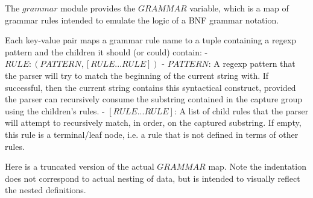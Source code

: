 The $grammar$ module provides the $GRAMMAR$ variable, which is a map of grammar rules intended to emulate the logic of a BNF grammar notation.

Each key-value pair maps a grammar rule name to a tuple containing a regexp pattern and the children it should (or could) contain:
- $RULE: (PATTERN, [RULE...RULE])$
- $PATTERN$: A regexp pattern that the parser will try to match the beginning of the current string with. If successful, then the current string contains this syntactical construct, provided the parser can recursively consume the substring contained in the capture group using the children's rules.
- $[RULE...RULE]$: A list of child rules that the parser will attempt to recursively match, in order, on the captured substring. If empty, this rule is a terminal/leaf node, i.e. a rule that is not defined in terms of other rules.

Here is a truncated version of the actual $GRAMMAR$ map. Note the indentation does not correspond to actual nesting of data, but is intended to visually reflect the nested definitions.

